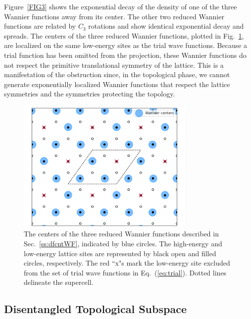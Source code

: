 \documentclass[galley,aps,pra,10pt,amsmath,amssymb,
    superscriptaddress,nofootinbib,longbibliography]{revtex4-2}
\newcounter{comm}
\newcommand{\eq}[1]{Eq.~(\ref{eq:#1})}
\begin{document}
Figure~\ref{FIG3} shows the exponential decay of the density of one of the three Wannier functions away from its center. The other two reduced Wannier functions are related by $C_3$ rotations and show identical exponential decay and spreads. The centers of the three reduced Wannier functions, plotted in Fig.~\ref{FIG4}, are localized on the same low-energy sites as the trial wave functions. Because a trial function has been omitted from the projection, these Wannier functions do not respect the primitive translational symmetry of the lattice. This is a manifestation of the obstruction since, in the topological phase, we cannot generate exponentially localized Wannier functions that respect the lattice symmetries and the symmetries protecting the topology.


\begin{figure}[t!]
\begin{center}
\includegraphics[width=3.4in]{fig4.png}
\end{center}
\vspace{-5mm}
\caption{The centers of the three reduced Wannier functions described in Sec.~\ref{ss:dfcntWF}, indicated by blue circles. The high-energy and low-energy lattice sites are represented by black open and filled circles, respectively. The red ``x"s mark the low-energy site excluded from the set of trial wave functions in \eq{trial}. Dotted lines delineate the supercell.}
\label{FIG4}
\end{figure}

\subsection{Disentangled Topological Subspace}
\end{document}
